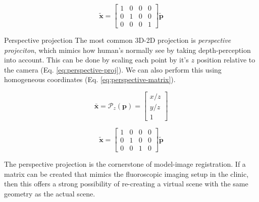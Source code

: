\begin{equation}
    \tilde{\mathbf{x}} = \begin{bmatrix}
        1 & 0 & 0 & 0 \\ 0 & 1 & 0 & 0 \\ 0 & 0 & 0 & 1
    \end{bmatrix}\tilde{\mathbf{p}}
    \label{eq:orthographic-proj}
\end{equation}

Perspective projection 
The most common 3D-2D projection is \emph{perspective projeciton}, which mimics how human's normally see by taking depth-perception into account. This can be done by scaling each point by it's $z$ position relative to the camera (Eq. \ref{eq:perspective-proj}). We can also perform this using homogeneous coordinates (Eq. \ref{eq:perspective-matrix}).

\begin{equation}
    \bar{\mathbf{x}} = \mathcal{P}_z(\mathbf{p}) = \begin{bmatrix}
        x/z \\ y/z \\ 1
    \end{bmatrix}
    \label{eq:perspective-proj}
\end{equation}

\begin{equation}
    \tilde{\mathbf{x}} = \begin{bmatrix}
        1 & 0 & 0 & 0 \\ 0 & 1 & 0 & 0 \\ 0 & 0 & 1 & 0 
    \end{bmatrix}\tilde{\mathbf{p}}
    \label{eq:perspective-matrix}
\end{equation}

The perspective projection is the cornerstone of model-image registration. If a matrix can be created that mimics the fluoroscopic imaging setup in the clinic, then this offers a strong possibility of re-creating a virtual scene with the same geometry as the actual scene.